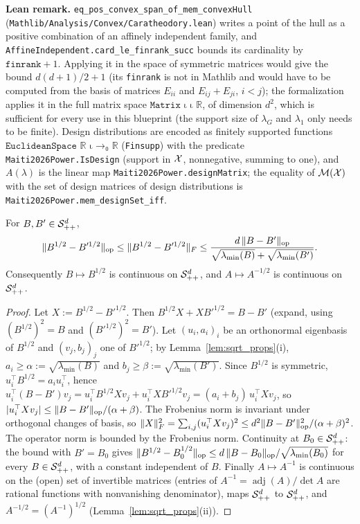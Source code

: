 \textbf{Lean remark.} \texttt{eq\_pos\_convex\_span\_of\_mem\_convexHull}
(\texttt{Mathlib/Analysis/Convex/Caratheodory.lean}) writes a point of the hull as a positive
combination of an affinely independent family, and
\texttt{AffineIndependent.card\_le\_finrank\_succ} bounds its cardinality by
$\texttt{finrank} + 1$. Applying it in the space of symmetric matrices would give the bound
$d(d+1)/2 + 1$ (its \texttt{finrank} is not in Mathlib and would have to be computed from the
basis of matrices $E_{ii}$ and $E_{ij} + E_{ji}$, $i < j$); the formalization applies it in the
full matrix space $\texttt{Matrix ι ι ℝ}$, of dimension $d^2$, which is sufficient for every use
in this blueprint (the support size of $\lambda_G$ and $\lambda_1$ only needs to be finite).
Design distributions are encoded as finitely supported functions
$\texttt{EuclideanSpace ℝ ι →₀ ℝ}$ (\texttt{Finsupp}) with the predicate \texttt{Maiti2026Power.IsDesign}
(support in $\mathcal{X}$, nonnegative, summing to one), and $A(\lambda)$ is the linear map
\texttt{Maiti2026Power.designMatrix}; the equality of $\mathcal{M}(\mathcal{X})$ with the set of design matrices
of design distributions is \texttt{Maiti2026Power.mem\_designSet\_iff}.

\begin{lemma}\label{lem:design_sqrt_continuous}
For $B, B' \in \mathcal{S}_{++}^{d}$,
\[
  \lVert B^{1/2} - B'^{1/2} \rVert_{\mathrm{op}} \le \lVert B^{1/2} - B'^{1/2} \rVert_F \le
  \frac{d\,\lVert B - B' \rVert_{\mathrm{op}}}{\sqrt{\lambda_{\min}(B)} + \sqrt{\lambda_{\min}(B')}} .
\]
Consequently $B \mapsto B^{1/2}$ is continuous on $\mathcal{S}_{++}^{d}$, and $A \mapsto A^{-1/2}$ is continuous
on $\mathcal{S}_{++}^{d}$.
\end{lemma}

\begin{proof}
Let $X := B^{1/2} - B'^{1/2}$. Then $B^{1/2}X + XB'^{1/2} = B - B'$ (expand, using
$(B^{1/2})^2 = B$ and $(B'^{1/2})^2 = B'$). Let $(u_i, a_i)_i$ be an orthonormal eigenbasis of
$B^{1/2}$ and $(v_j, b_j)_j$ one of $B'^{1/2}$; by Lemma~\ref{lem:sqrt_props}(i),
$a_i \ge \alpha := \sqrt{\lambda_{\min}(B)}$ and $b_j \ge \beta := \sqrt{\lambda_{\min}(B')}$.
Since $B^{1/2}$ is symmetric, $u_i^\top B^{1/2} = a_iu_i^\top$, hence
$u_i^\top(B - B')v_j = u_i^\top B^{1/2}Xv_j + u_i^\top XB'^{1/2}v_j = (a_i + b_j)\,u_i^\top Xv_j$, so
$\lvert u_i^\top X v_j \rvert \le \lVert B - B' \rVert_{\mathrm{op}}/(\alpha + \beta)$. The Frobenius norm is
invariant under orthogonal changes of basis, so $\lVert X \rVert_F^2 = \sum_{i,j}(u_i^\top Xv_j)^2 \le
d^2\lVert B-B' \rVert_{\mathrm{op}}^2/(\alpha+\beta)^2$. The operator norm is bounded by the Frobenius
norm. Continuity at $B_0 \in \mathcal{S}_{++}^{d}$: the bound with $B' = B_0$ gives
$\lVert B^{1/2} - B_0^{1/2} \rVert_{\mathrm{op}} \le d\,\lVert B - B_0 \rVert_{\mathrm{op}}/\sqrt{\lambda_{\min}(B_0)}$
for every $B \in \mathcal{S}_{++}^{d}$, with a constant independent of $B$. Finally $A \mapsto A^{-1}$ is
continuous on the (open) set of invertible matrices (entries of $A^{-1} = \operatorname{adj}(A)/\det A$
are rational functions with nonvanishing denominator), maps $\mathcal{S}_{++}^{d}$ to $\mathcal{S}_{++}^{d}$, and
$A^{-1/2} = (A^{-1})^{1/2}$ (Lemma~\ref{lem:sqrt_props}(ii)).
\end{proof}


